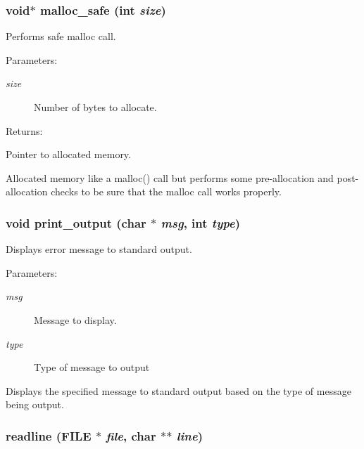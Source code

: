 \subsubsection{\setlength{\rightskip}{0pt plus 5cm}void$\ast$ malloc\_\-safe (int {\em size})}\label{util_8h_a9}


Performs safe malloc call.

\begin{Desc}
\item[Parameters: ]\par
\begin{description}
\item[{\em 
size}]Number of bytes to allocate.\end{description}
\end{Desc}
\begin{Desc}
\item[Returns: ]\par
Pointer to allocated memory.\end{Desc}
Allocated memory like a malloc() call but performs some pre-allocation and post-allocation checks to be sure that the malloc call works properly. 
\subsubsection{\setlength{\rightskip}{0pt plus 5cm}void print\_\-output (char $\ast$ {\em msg}, int {\em type})}\label{util_8h_a1}


Displays error message to standard output.

\begin{Desc}
\item[Parameters: ]\par
\begin{description}
\item[{\em 
msg}]Message to display. \item[{\em 
type}]Type of message to output\end{description}
\end{Desc}
Displays the specified message to standard output based on the type of message being output. 
\subsubsection{ readline (FILE $\ast$ {\em file}, char $\ast$$\ast$ {\em line})}\label{util_8h_a6}


